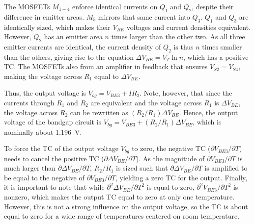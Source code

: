The MOSFETs $M_{1-4}$ enforce identical currents on $Q_1$ and $Q_2$, despite their difference in emitter areas. $M_5$ mirrors that same current into $Q_3$. $Q_1$ and $Q_3$ are identically sized, which makes their $V_{BE}$ voltages and current densities equivalent. However, $Q_2$ has an emitter area $n$ times larger than the other two. As all three emitter currents are identical, the current density of $Q_2$ is thus $n$ times smaller than the others, giving rise to the equation $\Delta V_{BE} = V_T \ln n$, which has a positive TC. The MOSFETs also from an amplifier in feedback that ensures $V_{S2} = V_{S4}$, making the voltage across $R_1$ equal to $\Delta V_{BE}$. 

Thus, the output voltage is $V_{bg} = V_{BE3} + IR_2$. Note, however, that since the currents through $R_1$ and $R_2$ are equivalent and the voltage across $R_1$ is $\Delta V_{BE}$, the voltage across $R_2$ can be rewritten as $(R_2 / R_1) \Delta V_{BE}$. Hence, the output voltage of the bandgap circuit is $V_{bg} = V_{BE3} + (R_2 / R_1) \Delta V_{BE}$, which is nominally about 1.196~V.

To force the TC of the output voltage $V_{bg}$ to zero, the negative TC ($\partial V_{BE3} / \partial T$) needs to cancel the positive TC ($\partial \Delta V_{BE} / \partial T$). As the magnitude of $\partial V_{BE3} / \partial T$ is much larger than $\partial \Delta V_{BE} / \partial T$, $R_2 / R_1$ is sized such that $\partial \Delta V_{BE} / \partial T$ is amplified to be equal to the negative of $\partial V_{BE3} / \partial T$, yielding a zero TC for the output. Finally, it is important to note that while $\partial^2 \Delta V_{BE} / \partial T^2$ is equal to zero, $\partial^2 V_{BE3} / \partial T^2$ is nonzero, which makes the output TC equal to zero at only one temperature. However, this is not a strong influence on the output voltage, so the TC is about equal to zero for a wide range of temperatures centered on room temperature.
